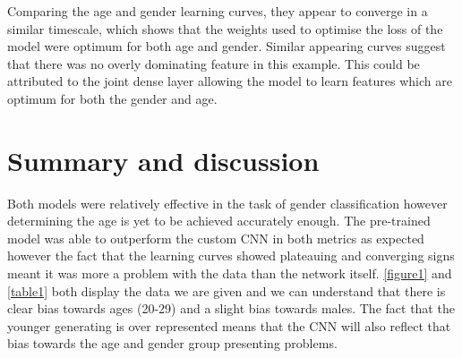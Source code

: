 \documentclass[11pt,a4paper]{article}
\begin{document}
Comparing the age and gender learning curves, they appear to converge in a similar timescale, which shows that the weights used to optimise the loss of the model were optimum for both age and gender. Similar appearing curves suggest that there was no overly dominating feature in this example. This could be attributed to the joint dense layer allowing the model to learn features which are optimum for both the gender and age.

\section{Summary and discussion} 
Both models were relatively effective in the task of gender classification however determining the age is yet to be achieved accurately enough. The pre-trained model was able to outperform the custom CNN in both metrics as expected however the fact that the learning curves showed plateauing and converging signs meant it was more a problem with the data than the network itself. \autoref{figure1} and \autoref{table1} both display the data we are given and we can understand that there is clear bias towards ages (20-29) and a slight bias towards males. The fact that the younger generating is over represented means that the CNN will also reflect that bias towards the age and gender group presenting problems. 
\newpage{}


\end{document}
